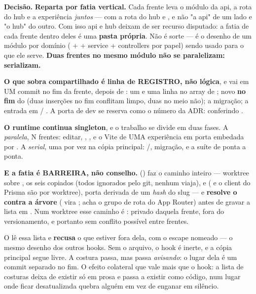 \textbf{Decisão.} \textbf{Reparta por fatia vertical.} Cada frente leva o módulo
da api, a rota do hub e a experiência \emph{juntos} --- 
com a rota do hub e , e não "a api" de um
lado e "o hub" do outro. Com isso api e hub deixam de ser recurso disputado: a
fatia de cada frente dentro deles é uma \textbf{pasta própria}. Não é sorte --- é
o desenho de um módulo por domínio ( +  + service +
controllers por papel) sendo usado para o que ele serve. \textbf{Duas frentes no
mesmo módulo não se paralelizam: serializam.}

\textbf{O que sobra compartilhado é linha de REGISTRO, não lógica}, e vai em UM
commit no fim da frente, depois de : um  e
uma linha no array de ;  novo \textbf{no fim} do
 (duas inserções no fim conflitam limpo, duas no meio não); a
migração; a entrada em  / . A porta
de dev se reserva como o número da ADR: conferindo .

\textbf{O runtime continua singleton}, e o trabalho se divide em duas fases. A
\emph{paralela}, N frentes: editar, , ,
e o Vite de UMA experiência em porta  embedada por
. A \emph{serial}, uma por vez na cópia principal:
/, migração, e a suíte de ponta a ponta.

\textbf{E a fatia é BARREIRA, não conselho.} 
() faz o caminho inteiro --- worktree
sobre , os seis  copiados (todos ignorados pelo git, nenhum
viaja),  e  ( e o client
do Prisma são por worktree), porta derivada de um \emph{hash} do slug --- e
\textbf{resolve o  contra a árvore} ( vira
;  acha o grupo de rota do App
Router) antes de gravar a lista em . Num worktree esse
caminho é : privado daquela frente, fora do
versionamento, e portanto sem conflito possível entre frentes.

O  lê essa lista e \textbf{recusa} o que estiver fora
dela, com o escape nomeado  --- o mesmo desenho
dos outros hooks. Sem o arquivo, o hook é inerte, e a cópia principal segue
livre. A costura passa, mas passa \emph{avisando}: o lugar dela é um commit
separado no fim. O efeito colateral que vale mais que o hook: a lista de
costuras deixa de existir só em prosa e passa a existir como código, num lugar
onde ficar desatualizada quebra alguém em vez de enganar em silêncio.

